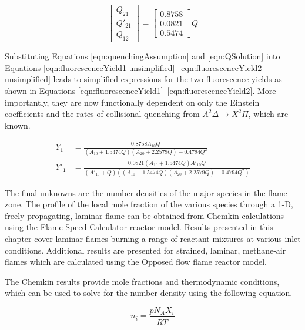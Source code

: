 \begin{equation}
  \left[
    \begin{matrix}
      Q_{21}\\
      Q'_{21}\\
      Q_{12}
    \end{matrix}
  \right] = \left[
   \begin{matrix}
      0.8758\\
      0.0821\\
      0.5474
    \end{matrix}
  \right] Q
  \label{eqn:QSolution}
\end{equation}

Substituting Equations \ref{eqn:quenchingAssumption} and \ref{eqn:QSolution} into Equations \ref{eqn:fluorescenceYield1-unsimplified}--\ref{eqn:fluorescenceYield2-unsimplified} leads to simplified expressions for the two fluorescence yields as shown in Equations \ref{eqn:fluorescenceYield1}--\ref{eqn:fluorescenceYield2}.
More importantly, they are now functionally dependent on only the Einstein coefficients and the rates of collisional quenching from \(A^2\Delta\rightarrow X^2\Pi\), which are known.

\begin{align}
  Y_1 &= \frac{ 0.8758 A_{10} Q }{ ( A_{10} + 1.5474 Q )( A_{20} + 2.2579 Q ) - 0.4794 Q^2 }
  \label{eqn:fluorescenceYield1}\\
  Y'_1 &= \frac{ 0.0821 ( A_{10} + 1.5474 Q ) A'_{10} Q }{ ( A'_{10} + Q ) \left( ( A_{10} + 1.5474 Q )( A_{20} + 2.2579 Q ) - 0.4794 Q^2 \right) }
  \label{eqn:fluorescenceYield2}
\end{align}

The final unknowns are the number densities of the major species in the flame zone.
The profile of the local mole fraction of the various species through a 1-D, freely propagating, laminar flame can be obtained from Chemkin calculations using the Flame-Speed Calculator reactor model.
Results presented in this chapter cover laminar flames burning a range of reactant mixtures at various inlet conditions.
Additional results are presented for strained, laminar, methane-air flames which are calculated using the Opposed flow flame reactor model.

The Chemkin results provide mole fractions and thermodynamic conditions, which can be used to solve for the number density using the following equation.

\begin{equation}
  n_i = \frac{pN_AX_i}{\bar{R}T}
  \label{eqn:numberDensity}
\end{equation}

